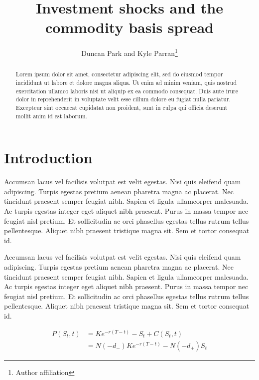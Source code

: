 \documentclass[12pt]{article}
\begin{document}
\title{
Investment shocks and the commodity basis spread}


\author{Duncan Park and Kyle Parran\footnote{Author affiliation}}
\begin{titlepage}
\maketitle


\begin{abstract}
Lorem ipsum dolor sit amet, consectetur adipiscing elit, sed do eiusmod tempor
incididunt ut labore et dolore magna aliqua. Ut enim ad minim veniam, quis
nostrud exercitation ullamco laboris nisi ut aliquip ex ea commodo consequat.
Duis aute irure dolor in reprehenderit in voluptate velit esse cillum dolore
eu fugiat nulla pariatur. Excepteur sint occaecat cupidatat non proident,
sunt in culpa qui officia deserunt mollit anim id est laborum.
\end{abstract}


\end{titlepage}

\section{Introduction}

Accumsan lacus vel facilisis volutpat est velit egestas. Nisi quis eleifend
quam adipiscing. Turpis egestas pretium aenean pharetra magna ac placerat.
Nec tincidunt praesent semper feugiat nibh. Sapien et ligula ullamcorper
malesuada. Ac turpis egestas integer eget aliquet nibh praesent. Purus in
massa tempor nec feugiat nisl pretium. Et sollicitudin ac orci phasellus
egestas tellus rutrum tellus pellentesque. Aliquet nibh praesent tristique
magna sit. Sem et tortor consequat id.


Accumsan lacus vel facilisis volutpat est velit egestas. Nisi quis eleifend
quam adipiscing. Turpis egestas pretium aenean pharetra magna ac placerat.
Nec tincidunt praesent semper feugiat nibh. Sapien et ligula ullamcorper
malesuada. Ac turpis egestas integer eget aliquet nibh praesent. Purus in
massa tempor nec feugiat nisl pretium. Et sollicitudin ac orci phasellus
egestas tellus rutrum tellus pellentesque. Aliquet nibh praesent tristique
magna sit. Sem et tortor consequat id.

\begin{align}
P(S_t, t) &= Ke^{-r(T - t)} - S_t + C(S_t, t)   \label{eq:align1}\\
          &= N(-d_-) Ke^{-r(T - t)} - N(-d_+) S_t \label{eq:align2}
\end{align}
\end{document}
